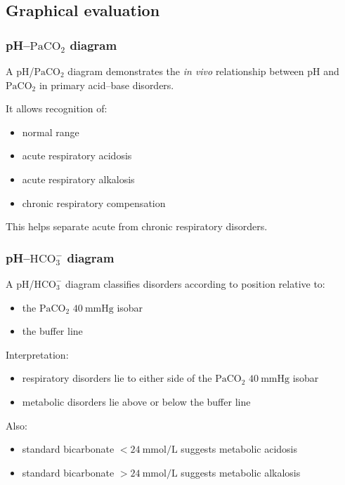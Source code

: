 \documentclass[11pt,a4paper]{article}
\begin{document}
\subsection{Graphical evaluation}

\subsubsection{pH--\(\mathrm{PaCO_2}\) diagram}
A pH/\(\mathrm{PaCO_2}\) diagram demonstrates the \emph{in vivo} relationship between pH and \(\mathrm{PaCO_2}\) in primary acid--base disorders.

It allows recognition of:
\begin{itemize}
  \item normal range
  \item acute respiratory acidosis
  \item acute respiratory alkalosis
  \item chronic respiratory compensation
\end{itemize}

This helps separate acute from chronic respiratory disorders.

\subsubsection{pH--\(\mathrm{HCO_3^-}\) diagram}
A pH/\(\mathrm{HCO_3^-}\) diagram classifies disorders according to position relative to:
\begin{itemize}
  \item the \(\mathrm{PaCO_2}\) \(40~\mathrm{mmHg}\) isobar
  \item the buffer line
\end{itemize}

Interpretation:
\begin{itemize}
  \item respiratory disorders lie to either side of the \(\mathrm{PaCO_2}\) \(40~\mathrm{mmHg}\) isobar
  \item metabolic disorders lie above or below the buffer line
\end{itemize}

Also:
\begin{itemize}
  \item standard bicarbonate \(< 24~\mathrm{mmol/L}\) suggests metabolic acidosis
  \item standard bicarbonate \(> 24~\mathrm{mmol/L}\) suggests metabolic alkalosis
\end{itemize}
\end{document}
